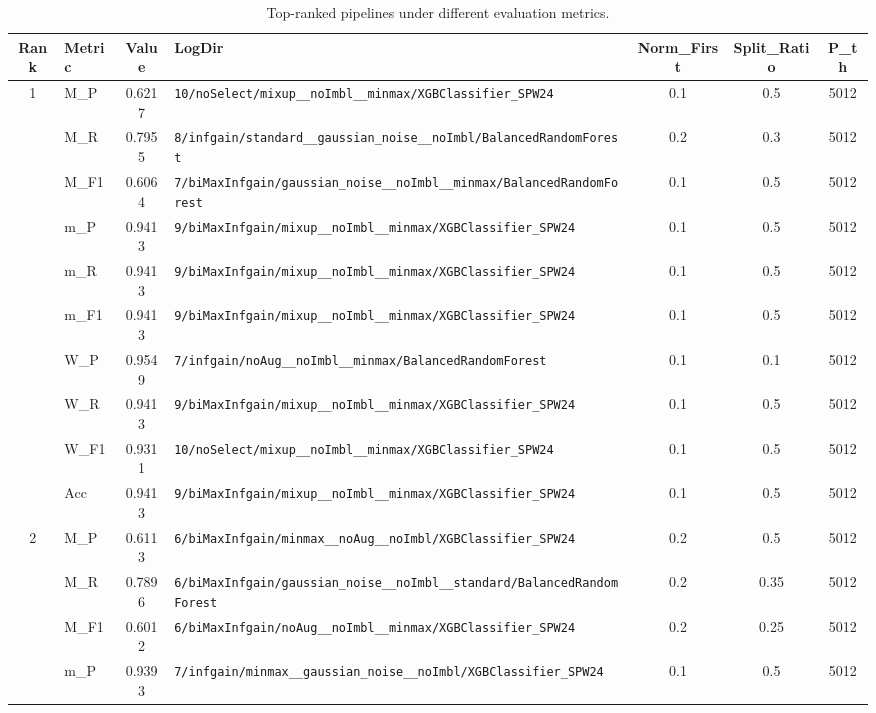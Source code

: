\begin{table}[htbp]
\caption{Top-ranked pipelines under different evaluation metrics.}
\label{tab:rank_metric_vertical}
\centering
\small
\setlength{\tabcolsep}{4pt}
\begin{tabular}{|c|l|c|>{\ttfamily\footnotesize}p{7.2cm}|c|c|c|}
\hline
Rank & Metric & Value & LogDir & Norm\_First & Split\_Ratio & P\_th \\
\hline
\multirow{10}{*}{1} & M\_P & 0.6217 & \texttt{10/noSelect/mixup\_\_noImbl\_\_minmax/XGBClassifier\_SPW24} & 0.1 & 0.5  & 5012 \\ 
 & M\_R & 0.7955 & \texttt{8/infgain/standard\_\_gaussian\_noise\_\_noImbl/BalancedRandomForest} & 0.2 & 0.3  & 5012 \\ 
 & M\_F1 & 0.6064 & \texttt{7/biMaxInfgain/gaussian\_noise\_\_noImbl\_\_minmax/BalancedRandomForest} & 0.1 & 0.5  & 5012 \\ 
 & m\_P & 0.9413 & \texttt{9/biMaxInfgain/mixup\_\_noImbl\_\_minmax/XGBClassifier\_SPW24} & 0.1 & 0.5  & 5012 \\ 
 & m\_R & 0.9413 & \texttt{9/biMaxInfgain/mixup\_\_noImbl\_\_minmax/XGBClassifier\_SPW24} & 0.1 & 0.5  & 5012 \\ 
 & m\_F1 & 0.9413 & \texttt{9/biMaxInfgain/mixup\_\_noImbl\_\_minmax/XGBClassifier\_SPW24} & 0.1 & 0.5  & 5012 \\ 
 & W\_P & 0.9549 & \texttt{7/infgain/noAug\_\_noImbl\_\_minmax/BalancedRandomForest} & 0.1 & 0.1  & 5012 \\ 
 & W\_R & 0.9413 & \texttt{9/biMaxInfgain/mixup\_\_noImbl\_\_minmax/XGBClassifier\_SPW24} & 0.1 & 0.5  & 5012 \\ 
 & W\_F1 & 0.9311 & \texttt{10/noSelect/mixup\_\_noImbl\_\_minmax/XGBClassifier\_SPW24} & 0.1 & 0.5  & 5012 \\ 
 & Acc & 0.9413 & \texttt{9/biMaxInfgain/mixup\_\_noImbl\_\_minmax/XGBClassifier\_SPW24} & 0.1 & 0.5  & 5012 \\ 
\hline
\multirow{10}{*}{2} & M\_P & 0.6113 & \texttt{6/biMaxInfgain/minmax\_\_noAug\_\_noImbl/XGBClassifier\_SPW24} & 0.2 & 0.5  & 5012 \\ 
 & M\_R & 0.7896 & \texttt{6/biMaxInfgain/gaussian\_noise\_\_noImbl\_\_standard/BalancedRandomForest} & 0.2 & 0.35  & 5012 \\ 
 & M\_F1 & 0.6012 & \texttt{6/biMaxInfgain/noAug\_\_noImbl\_\_minmax/XGBClassifier\_SPW24} & 0.2 & 0.25  & 5012 \\ 
 & m\_P & 0.9393 & \texttt{7/infgain/minmax\_\_gaussian\_noise\_\_noImbl/XGBClassifier\_SPW24} & 0.1 & 0.5  & 5012 \\ 

\end{tabular}
\end{table}
